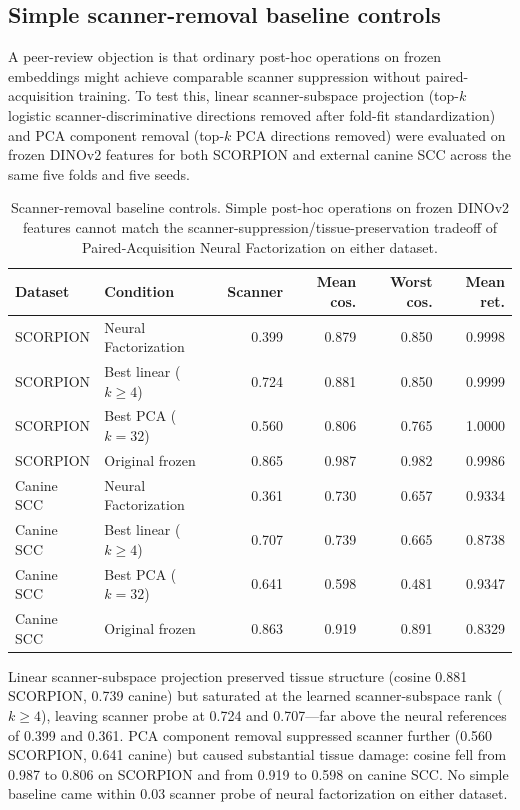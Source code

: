 \documentclass[10pt]{article}
\begin{document}


\subsection{Simple scanner-removal baseline controls}
A peer-review objection is that ordinary post-hoc operations on frozen embeddings might achieve comparable scanner suppression without paired-acquisition training. To test this, linear scanner-subspace projection (top-$k$ logistic scanner-discriminative directions removed after fold-fit standardization) and PCA component removal (top-$k$ PCA directions removed) were evaluated on frozen DINOv2 features for both SCORPION and external canine SCC across the same five folds and five seeds.

\begin{table}[t]
\centering
\caption{Scanner-removal baseline controls. Simple post-hoc operations on frozen DINOv2 features cannot match the scanner-suppression/tissue-preservation tradeoff of Paired-Acquisition Neural Factorization on either dataset.}
\scriptsize
\setlength{\tabcolsep}{1.9pt}
\begin{tabular}{@{}llrrrr@{}}
\toprule
Dataset & Condition & Scanner & Mean cos. & Worst cos. & Mean ret. \\
\midrule
SCORPION & Neural Factorization & 0.399 & 0.879 & 0.850 & 0.9998 \\
SCORPION & Best linear ($k{\ge}4$) & 0.724 & 0.881 & 0.850 & 0.9999 \\
SCORPION & Best PCA ($k{=}32$) & 0.560 & 0.806 & 0.765 & 1.0000 \\
SCORPION & Original frozen & 0.865 & 0.987 & 0.982 & 0.9986 \\
Canine SCC & Neural Factorization & 0.361 & 0.730 & 0.657 & 0.9334 \\
Canine SCC & Best linear ($k{\ge}4$) & 0.707 & 0.739 & 0.665 & 0.8738 \\
Canine SCC & Best PCA ($k{=}32$) & 0.641 & 0.598 & 0.481 & 0.9347 \\
Canine SCC & Original frozen & 0.863 & 0.919 & 0.891 & 0.8329 \\
\bottomrule
\end{tabular}
\label{tab:baseline_murder}
\end{table}

Linear scanner-subspace projection preserved tissue structure (cosine 0.881 SCORPION, 0.739 canine) but saturated at the learned scanner-subspace rank ($k{\ge}4$), leaving scanner probe at 0.724 and 0.707---far above the neural references of 0.399 and 0.361. PCA component removal suppressed scanner further (0.560 SCORPION, 0.641 canine) but caused substantial tissue damage: cosine fell from 0.987 to 0.806 on SCORPION and from 0.919 to 0.598 on canine SCC. No simple baseline came within 0.03 scanner probe of neural factorization on either dataset.
\end{document}
